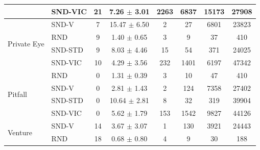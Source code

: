 \documentclass[a4paper,11pt]{elsarticle}
\begin{document}
\begin{table}[t!]
\begin{tabular}{l|l|cccccc}
& \multicolumn{1}{l|}{SND-VIC} & \multicolumn{1}{c}{21} & \multicolumn{1}{c}{7.26 $\pm$ 3.01} & \multicolumn{1}{c}{2263} & \multicolumn{1}{c}{6837} & \multicolumn{1}{c}{15173} & \multicolumn{1}{c}{27908} \\
\hline%
\multirow{4}{*}{Private Eye}
& \multicolumn{1}{l|}{SND-V} & \multicolumn{1}{c}{7} & \multicolumn{1}{c}{15.47 $\pm$ 6.50} & \multicolumn{1}{c}{2} & \multicolumn{1}{c}{27} & \multicolumn{1}{c}{6801} & \multicolumn{1}{c}{23823} \\
& \multicolumn{1}{l|}{RND} & \multicolumn{1}{c}{9} & \multicolumn{1}{c}{1.40 $\pm$ 0.65} & \multicolumn{1}{c}{3} & \multicolumn{1}{c}{9} & \multicolumn{1}{c}{37} & \multicolumn{1}{c}{410} \\ 
& \multicolumn{1}{l|}{SND-STD} & \multicolumn{1}{c}{9} & \multicolumn{1}{c}{8.03 $\pm$ 4.46} & \multicolumn{1}{c}{15} & \multicolumn{1}{c}{54} & \multicolumn{1}{c}{371} & \multicolumn{1}{c}{24025} \\
& \multicolumn{1}{l|}{SND-VIC} & \multicolumn{1}{c}{10} & \multicolumn{1}{c}{4.29 $\pm$ 3.56} & \multicolumn{1}{c}{232} & \multicolumn{1}{c}{1401} & \multicolumn{1}{c}{6197} & \multicolumn{1}{c}{47342} \\
\hline%
\multirow{4}{*}{Pitfall}
& \multicolumn{1}{l|}{RND} & \multicolumn{1}{c}{0} & \multicolumn{1}{c}{1.31 $\pm$ 0.39} & \multicolumn{1}{c}{3} & \multicolumn{1}{c}{10} & \multicolumn{1}{c}{47} & \multicolumn{1}{c}{410} \\
& \multicolumn{1}{l|}{SND-V} & \multicolumn{1}{c}{0} & \multicolumn{1}{c}{2.81 $\pm$ 1.43} & \multicolumn{1}{c}{2} & \multicolumn{1}{c}{124} & \multicolumn{1}{c}{7358} & \multicolumn{1}{c}{27402} \\
& \multicolumn{1}{l|}{SND-STD} & \multicolumn{1}{c}{0} & \multicolumn{1}{c}{10.64 $\pm$ 2.81} & \multicolumn{1}{c}{8} & \multicolumn{1}{c}{32} & \multicolumn{1}{c}{319} & \multicolumn{1}{c}{39904} \\
& \multicolumn{1}{l|}{SND-VIC} & \multicolumn{1}{c}{0} & \multicolumn{1}{c}{5.62 $\pm$ 1.79} & \multicolumn{1}{c}{153} & \multicolumn{1}{c}{1542} & \multicolumn{1}{c}{9827} & \multicolumn{1}{c}{44126} \\
\hline%
\multirow{4}{*}{Venture}
& \multicolumn{1}{l|}{SND-V} & \multicolumn{1}{c}{14} & \multicolumn{1}{c}{3.67 $\pm$ 3.07} & \multicolumn{1}{c}{1} & \multicolumn{1}{c}{130} & \multicolumn{1}{c}{3921} & \multicolumn{1}{c}{24443} \\
& \multicolumn{1}{l|}{RND} & \multicolumn{1}{c}{18} & \multicolumn{1}{c}{0.68 $\pm$ 0.80} & \multicolumn{1}{c}{4} & \multicolumn{1}{c}{9} & \multicolumn{1}{c}{30} & \multicolumn{1}{c}{188} \\ 

\end{tabular}
\end{table}
\end{document}
